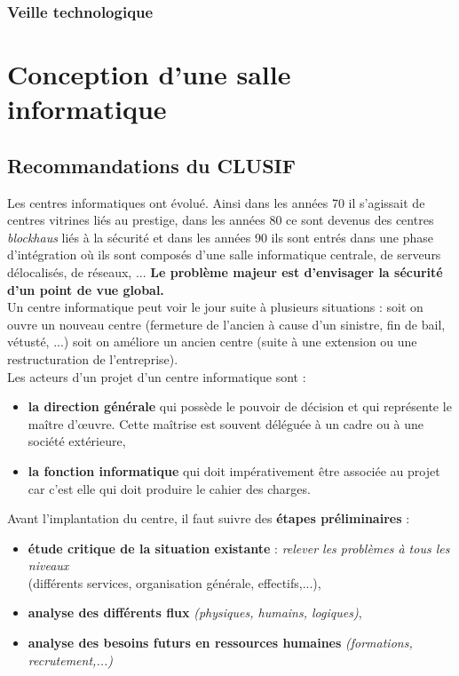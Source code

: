 \documentclass[10pt,a4paper,oneside,titlepage]{report}
\newcommand{\titre}[1]{\textcolor{title}{#1}}
\newcommand{\newterm}[1]{\textit{#1}}
\newcommand{\strong}[1]{\textbf{\titre{#1}}}
\begin{document}
\subsubsection{Veille technologique}

\section{Conception d'une salle informatique}

\subsection{Recommandations du CLUSIF}

Les centres informatiques ont évolué. Ainsi dans les années 70 il s'agissait de centres vitrines liés au prestige, dans les années 80 ce sont devenus des centres
\newterm{blockhaus} liés à la sécurité et dans les années 90 ils sont entrés dans une phase d'intégration où ils sont composés d'une salle informatique centrale, de
serveurs délocalisés, de réseaux, ... \strong{Le problème majeur est d'envisager la sécurité d'un point de vue global.} \\

Un centre informatique peut voir le jour suite à plusieurs situations : soit on ouvre un nouveau centre (fermeture de l'ancien à cause d'un sinistre, fin de bail, vétusté,
...) soit on améliore un ancien centre (suite à une extension ou une restructuration de l'entreprise). \\

\noindent Les acteurs d'un projet d'un centre informatique sont :
\begin{itemize}
\item \strong{la direction générale} qui possède le pouvoir de décision et qui représente le maître d'\oe uvre. Cette maîtrise est souvent déléguée à un cadre ou à une
société extérieure,
\item \strong{la fonction informatique} qui doit impérativement \^etre associée au projet car c'est elle qui doit produire le cahier des charges. \\
\end{itemize}

\noindent Avant l'implantation du centre, il faut suivre des \strong{étapes préliminaires} :
\begin{itemize}
\item \strong{étude critique de la situation existante} : \textit{relever les problèmes à tous les niveaux}\\(différents services, organisation générale, effectifs,...),
\item \strong{analyse des différents flux} \textit{(physiques, humains, logiques)},
\item \strong{analyse des besoins futurs en ressources humaines} \textit{(formations, recrutement,...)}
\end{itemize}
\end{document}
